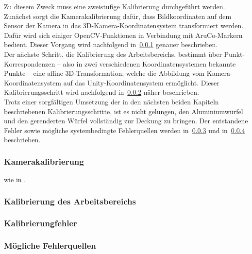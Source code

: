 Zu diesem Zweck muss eine zweistufige Kalibrierung durchgeführt werden. Zunächst sorgt die Kamerakalibrierung dafür, dass Bildkoordinaten auf dem Sensor der Kamera in das 3D-Kamera-Koordinatensystem transformiert werden. Dafür wird sich einiger OpenCV-Funktionen in Verbindung mit AruCo-Markern bedient. Dieser Vorgang wird nachfolgend in~\ref{sec:camCalib} genauer beschrieben.\\
Der nächste Schritt, die Kalibrierung des Arbeitsbereichs, bestimmt über Punkt-Korrespondenzen -- also in zwei verschiedenen Koordinatensystemen bekannte Punkte -- eine affine 3D-Transformation, welche die Abbildung vom Kamera-Koordinatensystem auf das Unity-Koordinatensystem ermöglicht. Dieser Kalibrierungsschritt wird nachfolgend in~\ref{sec:planeCalib} näher beschrieben.\\
Trotz einer sorgfältigen Umsetzung der in den nächsten beiden Kapiteln beschriebenen Kalibrierungsschritte, ist es nicht gelungen, den Aluminiumwürfel und den gerenderten Würfel vollständig zur Deckung zu bringen. Der entstandene Fehler sowie mögliche systembedingte Fehlerquellen werden in~\ref{sec:calibError} und in~\ref{sec:calibErrorSources} beschrieben. 

\subsubsection{Kamerakalibrierung}\label{sec:camCalib}
wie in \cite{Meisel:77890}.


\subsubsection{Kalibrierung des Arbeitsbereichs}\label{sec:planeCalib}
\subsubsection{Kalibrierungfehler} \label{sec:calibError}
\subsubsection{Mögliche Fehlerquellen} \label{sec:calibErrorSources}


